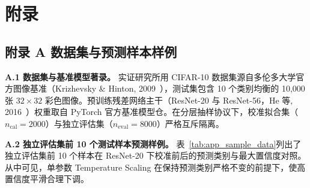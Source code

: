 {}
\section*{附录}

{}
\subsection*{附录 A 数据集与预测样本样例}

\textbf{A.1 数据集与基准模型著录。}
实证研究所用 CIFAR-10 数据集源自多伦多大学官方图像基准（Krizhevsky \& Hinton, 2009~\cite{krizhevsky2009learning}），测试集包含 10 个类别均衡的 10,000 张 $32 \times 32$ 彩色图像。预训练残差网络主干（ResNet-20 与 ResNet-56，He 等, 2016~\cite{he2016deep}）权重取自 PyTorch 官方基准模型仓。在分层抽样协议下，校准拟合集（$n_{\mathrm{cal}}=2000$）与独立评估集（$n_{\mathrm{eval}}=8000$）严格互斥隔离。

\textbf{A.2 独立评估集前 10 个测试样本预测样例。}
表~\ref{tab:app_sample_data}列出了独立评估集前 10 个样本在 ResNet-20 下校准前后的预测类别与最大置信度对照。从中可见，单参数 Temperature Scaling 在保持预测类别严格不变的前提下，使高置信度平滑合理下调。

\begin{table}[htbp]
\centering\small
\caption{独立评估集前 10 个样本在 ResNet-20 模型下校准前后预测结果对照}\label{tab:app_sample_data}
\end{table}


